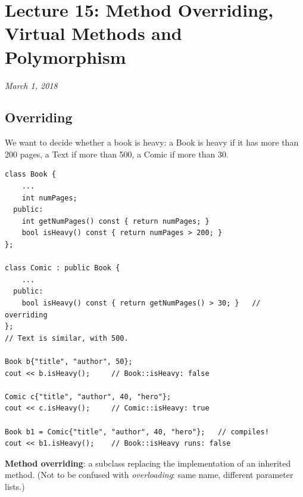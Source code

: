 \chapter{Lecture 15: Method Overriding, Virtual Methods and Polymorphism}
\begin{center}
\textit{March 1, 2018}
\end{center}

\section{Overriding}
We want to decide whether a book is heavy: a Book is heavy if it has more than
200 pages, a Text if more than 500, a Comic if more than 30.

\begin{lstlisting}[style=cpp]
class Book {
    ...
    int numPages;
  public:
    int getNumPages() const { return numPages; }
    bool isHeavy() const { return numPages > 200; }
};

class Comic : public Book {
    ...
  public:
    bool isHeavy() const { return getNumPages() > 30; }   // overriding
};
// Text is similar, with 500.

Book b{"title", "author", 50};
cout << b.isHeavy();     // Book::isHeavy: false

Comic c{"title", "author", 40, "hero"};
cout << c.isHeavy();     // Comic::isHeavy: true

Book b1 = Comic{"title", "author", 40, "hero"};   // compiles!
cout << b1.isHeavy();    // Book::isHeavy runs: false
\end{lstlisting}

\begin{definition}
\textbf{Method overriding}: a subclass replacing the implementation of an
inherited method. (Not to be confused with \emph{overloading}: same name,
different parameter lists.)
\end{definition}

